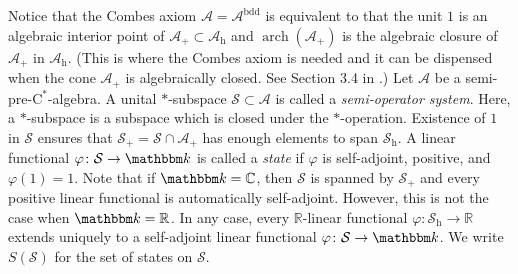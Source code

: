 \documentclass[12pt]{amsart}
\theoremstyle{definition}
\begin{document}
Notice that the Combes axiom ${{\mathcal A}}={{\mathcal A}}^{\mathrm{bdd}}$ is equivalent to that
the unit $1$ is an algebraic interior point of ${{\mathcal A}}_+\subset{{\mathcal A}}_{\mathrm{h}}$ and
$\operatorname*{arch}({{\mathcal A}}_+)$ is the algebraic closure of ${{\mathcal A}}_+$ in ${{\mathcal A}}_{\mathrm{h}}$.
(This is where the Combes axiom is needed and it can be dispensed
when the cone ${{\mathcal A}}_+$ is algebraically closed. See Section 3.4 in \cite{schmudgen}.)
Let ${{\mathcal A}}$ be a {semi-pre-$\mathrm{C}^*$-alge\-bra\xspace}.
A unital $*$-subspace ${{\mathcal S}}\subset{{\mathcal A}}$ is called a \emph{semi-operator system}.
Here, a $*$-subspace is a subspace which is closed under the $*$-operation.
Existence of $1$ in ${{\mathcal S}}$ ensures that ${{\mathcal S}}_+={{\mathcal S}} \cap {{\mathcal A}}_+$ has enough elements
to span ${{\mathcal S}}_{\mathrm{h}}$. A linear functional ${\varphi}\colon{{\mathcal S}}\to{{\mathbbm k}}$
is called a \emph{state} if ${\varphi}$ is self-adjoint, positive, and ${\varphi}(1)=1$.
Note that if ${{\mathbbm k}}={{\mathbb C}}$, then ${{\mathcal S}}$ is spanned by ${{\mathcal S}}_+$ and every positive linear
functional is automatically self-adjoint. However, this is not the case when ${{\mathbbm k}}={{\mathbb R}}$.
In any case, every ${{\mathbb R}}$-linear functional ${\varphi}\colon{{\mathcal S}}_{\mathrm{h}}\to{{\mathbb R}}$ extends
uniquely to a self-adjoint linear functional ${\varphi}\colon{{\mathcal S}}\to{{\mathbbm k}}$.
We write $S({{\mathcal S}})$ for the set of states on ${{\mathcal S}}$.
\end{document}
